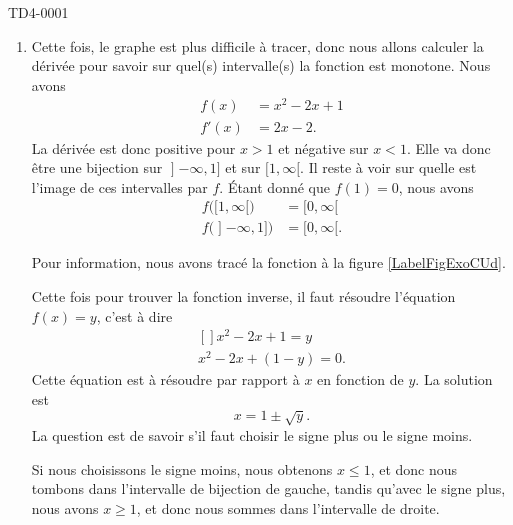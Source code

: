 \begin{corrige}{TD4-0001}
\begin{enumerate}
		\item
			Cette fois, le graphe est plus difficile à tracer, donc nous allons calculer la dérivée pour savoir sur quel(s) intervalle(s) la fonction est monotone. Nous avons
			\begin{subequations}
				\begin{align}
					f(x)&=x^2-2x+1\\
					f'(x)&=2x-2.
				\end{align}
			\end{subequations}
			La dérivée est donc positive pour $x>1$ et négative sur $x<1$. Elle va donc être une bijection sur $\mathopen] -\infty , 1 \mathclose]$ et sur $\mathopen[ 1 , \infty [$. Il reste à voir sur quelle est l'image de ces intervalles par $f$. Étant donné que $f(1)=0$, nous avons
			\begin{subequations}
				\begin{align}
					f\big( \mathopen[ 1 , \infty [ \big)&=\mathopen[ 0 , \infty [\\
					f\big( \mathopen] -\infty , 1 \mathclose] \big)&=\mathopen[ 0 , \infty [.
				\end{align}
			\end{subequations}
			
			Pour information, nous avons tracé la fonction à la figure \ref{LabelFigExoCUd}.
			\newcommand{\CaptionFigExoCUd}{La fonction de l'exerice \ref{exoTD4-0001}.\ref{ItemexoTD1ii}. Remarquer la symétrie autour du sommet, comme toute fonction du second degré. Pour un $y$ donné, il y a \emph{deux} $x$ sur lesquels fa fonction vaut $y$.}


			Cette fois pour trouver la fonction inverse, il faut résoudre l'équation $f(x)=y$, c'est à dire
			\begin{equation}
				\begin{aligned}[]
					x^2-2x+1=y\\
					x^2-2x+(1-y)=0.
				\end{aligned}
			\end{equation}
			Cette équation est à résoudre par rapport à $x$ en fonction de $y$. La solution est 
			\begin{equation}
				x=1\pm\sqrt{y}.
			\end{equation}
			La question est de savoir s'il faut choisir le signe plus ou le signe moins.
			
			Si nous choisissons le signe moins, nous obtenons $x\leq 1$, et donc nous tombons dans l'intervalle de bijection de gauche, tandis qu'avec le signe plus, nous avons $x\geq 1$, et donc nous sommes dans l'intervalle de droite.


\end{enumerate}
\end{corrige}
